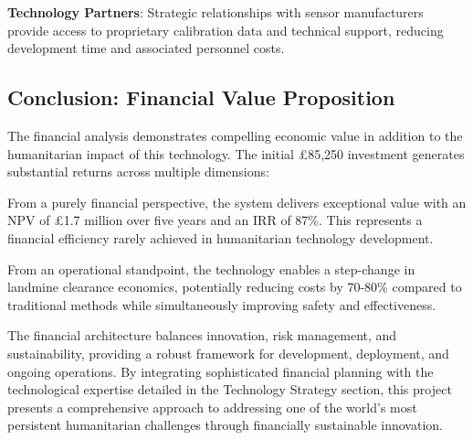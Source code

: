 \textbf{Technology Partners}: Strategic relationships with sensor manufacturers provide access to proprietary calibration data and technical support, reducing development time and associated personnel costs.

\subsection{Conclusion: Financial Value Proposition}
The financial analysis demonstrates compelling economic value in addition to the humanitarian impact of this technology. The initial \pounds 85,250 investment generates substantial returns across multiple dimensions:

From a purely financial perspective, the system delivers exceptional value with an NPV of \pounds 1.7 million over five years and an IRR of 87\%. This represents a financial efficiency rarely achieved in humanitarian technology development.

From an operational standpoint, the technology enables a step-change in landmine clearance economics, potentially reducing costs by 70-80\% compared to traditional methods while simultaneously improving safety and effectiveness.

The financial architecture balances innovation, risk management, and sustainability, providing a robust framework for development, deployment, and ongoing operations. By integrating sophisticated financial planning with the technological expertise detailed in the Technology Strategy section, this project presents a comprehensive approach to addressing one of the world's most persistent humanitarian challenges through financially sustainable innovation.
